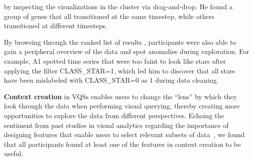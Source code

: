  by inspecting the visualizations
 in the cluster via drag-and-drop.
 He found a group of genes that all transitioned
 at the same timestep, while others transitioned
 at different timesteps.
 \par By browsing through the ranked list of
 results , participants were also able to gain a peripheral overview of the data and spot anomalies during exploration. For example, A1 spotted time series that were too faint to look like stars after applying the filter CLASS\_STAR=1,
 which led him to discover that all stars have been mislabeled with CLASS\_STAR=0 as 1 during data cleaning.
 \par \textbf{Context creation} in VQSs enables users to change the ``lens''
 by which they look through the data
 when performing visual querying,
 thereby creating more opportunities
 to explore the data from different perspectives. Echoing the sentiment from past studies in visual analytics regarding the importance of designing features that enable users to select relevant subsets of data~\cite{Shneiderman1994,Amar2005,Heer2012}, we found that all participants found at least one of the features in context creation to be useful.

